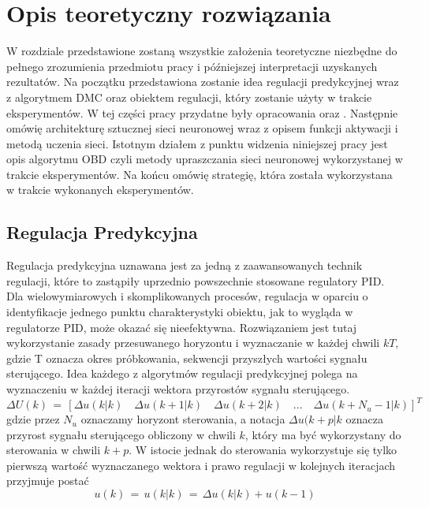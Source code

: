 \newpage %
\section{Opis teoretyczny rozwiązania}
W rozdziale przedstawione zostaną wszystkie założenia teoretyczne niezbędne do pełnego zrozumienia przedmiotu pracy i późniejszej interpretacji uzyskanych rezultatów. Na początku przedstawiona zostanie idea regulacji predykcyjnej wraz z algorytmem DMC oraz obiektem regulacji, który zostanie użyty w trakcie eksperymentów. W tej części pracy przydatne były opracowania \cite{stp2009} oraz \cite{tatjewski2016}. Następnie omówię architekturę sztucznej sieci neuronowej wraz z opisem funkcji aktywacji i metodą uczenia sieci. Istotnym działem z punktu widzenia niniejszej pracy jest opis algorytmu OBD czyli metody upraszczania sieci neuronowej wykorzystanej w trakcie eksperymentów. Na końcu omówię strategię, która została wykorzystana w trakcie wykonanych eksperymentów.

\subsection{Regulacja Predykcyjna}
Regulacja predykcyjna uznawana jest za jedną z zaawansowanych technik regulacji, które to zastąpiły uprzednio powszechnie stosowane regulatory PID. Dla wielowymiarowych i skomplikowanych procesów, regulacja w oparciu o identyfikacje jednego punktu charakterystyki obiektu, jak to wygląda w regulatorze PID, może okazać się nieefektywna. Rozwiązaniem jest tutaj wykorzystanie zasady przesuwanego horyzontu i wyznaczanie w każdej chwili \(kT\), gdzie T oznacza okres próbkowania, sekwencji przyszłych wartości sygnału sterującego. Idea każdego z algorytmów regulacji predykcyjnej polega na wyznaczeniu w każdej iteracji wektora przyrostów sygnału sterującego.
\begin{equation}
\Delta U(k) \, = \, [\Delta u(k|k)\quad \Delta u(k+1|k)\quad \Delta u(k+2|k)\quad ... \quad \Delta u(k + N_u - 1|k)]^T
\end{equation}
gdzie przez \(N_u\) oznaczamy horyzont sterowania, a notacja \(\Delta u(k+p|k\) oznacza przyrost sygnału sterującego obliczony w chwili \(k\), który ma być wykorzystany do sterowania w chwili \(k+p\). W istocie jednak do sterowania wykorzystuje się tylko pierwszą wartość wyznaczanego wektora i prawo regulacji w kolejnych iteracjach przyjmuje postać
\begin{equation}
u(k) \, = \, u(k|k) \, = \, \Delta u(k|k) + u(k-1)
\end{equation}

